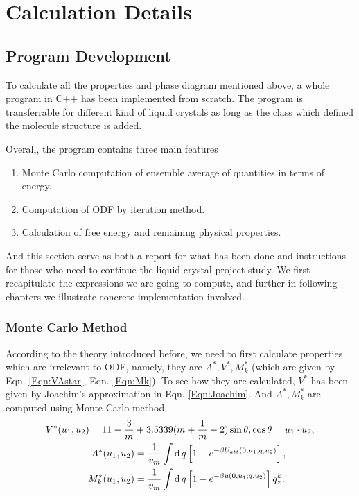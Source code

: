
\chapter{Calculation Details}

\section{Program Development}
To calculate all the properties and phase diagram mentioned above, a whole program in C++ has been implemented from scratch. The program is transferrable for different kind of liquid crystals as long as the class which defined the molecule structure is added.

Overall, the program contains three main features
\begin{enumerate}
	\item Monte Carlo computation of ensemble average of quantities in terms of energy.
	\item Computation of ODF by iteration method.
	\item Calculation of free energy and remaining physical properties.
\end{enumerate}

And this section serve as both a report for what has been done and instructions for those who need to continue the liquid crystal project study. We first recapitulate the expressions we are going to compute, and further in following chapters we illustrate concrete implementation involved.

\subsection{Monte Carlo Method}
According to the theory introduced before, we need to first calculate properties which are irrelevant to ODF, namely, they are $A^*, V^*, M_k^*$ (which are given by Eqn. \ref{Eqn:VAstar}, Eqn. \ref{Eqn:Mk}). To see how they are calculated, $V^*$ has been given by Joachim's approximation in Eqn. \ref{Eqn:Joachim}. And $A^*, M_k^*$ are computed using Monte Carlo method.
\begin{equation*}	
	\begin{split}
		V^*(u_1,u_2)=11-\frac{3}{m}&+3.5339(m+\frac{1}{m}-2)\sin\theta,  \cos\theta=u_1\cdot u_2,\\
		A^*(u_1,u_2)&=\frac{1}{v_m}\int\operatorname{d}q\left[1-e^{-\beta U_{att}(0,u_1;q,u_2)}\right],\\
		M_k^*(u_1,u_2)&=\frac{1}{v_m}\int\operatorname{d}q \left[1-e^{-\beta u(0,u_1;q,u_2)}\right]q_z^k.
	\end{split}
\end{equation*}


